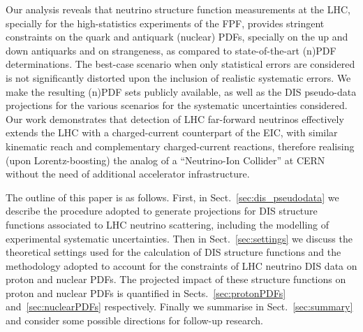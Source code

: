 Our analysis reveals that  neutrino structure function measurements at the LHC, specially
for the high-statistics  experiments of the FPF, provides  stringent constraints
on the quark and antiquark (nuclear) PDFs, specially on the up and down
antiquarks and on strangeness, as compared to state-of-the-art (n)PDF determinations.
%
The best-case scenario when only statistical errors are considered is not
significantly distorted upon the inclusion of realistic systematic errors.
%
We make the resulting (n)PDF sets publicly available, as well as the DIS pseudo-data projections
for the various scenarios for the systematic uncertainties considered.
%
Our work demonstrates that detection of LHC far-forward neutrinos  effectively
extends the LHC with a charged-current counterpart of the EIC,
with similar kinematic reach and complementary charged-current reactions,
therefore realising (upon Lorentz-boosting) the analog of a ``Neutrino-Ion Collider'' at CERN
without the need of additional accelerator infrastructure.


The outline of this paper is as follows.
%
First, in Sect.~\ref{sec:dis_pseudodata} we describe the procedure
adopted to generate projections for DIS structure functions associated to
LHC neutrino scattering, including the modelling of experimental systematic
uncertainties.
%
Then in Sect.~\ref{sec:settings} we discuss the theoretical settings used
for the calculation of DIS structure functions and the methodology adopted
to account for the constraints of LHC neutrino DIS data on proton and nuclear PDFs.
%
The projected impact of these structure functions on proton and nuclear
PDFs is quantified in Sects.~\ref{sec:protonPDFs} and~\ref{sec:nuclearPDFs} respectively.
%
Finally we summarise in Sect.~\ref{sec:summary} and consider some possible
directions for follow-up research.

